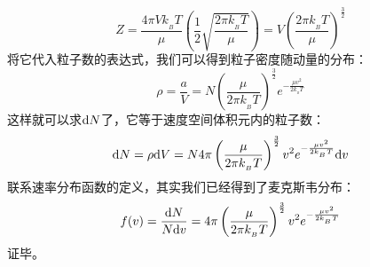 \documentclass{Physics_H_Notes}
\begin{document}
\begin{prove}
\begin{equation}
                Z = \frac{4 \pi V k_{_B}T}{\mu} (\frac{1}{2}\sqrt{\frac{2\pi k_{_B}T}{\mu}}) = V\left(\frac{2\pi k_{_B}T}{\mu}\right)^{\frac{3}{2}}
                \label{of_Z}
            \end{equation}
            将它代入粒子数的表达式，我们可以得到粒子密度随动量的分布：
            \begin{equation}
                \rho = \frac{a}{V} = N\left(\frac{\mu}{2\pi k_{_B}T}\right)^{\frac{3}{2}}e^{-\frac{\mu v^{2}}{2k_{_B}T}}
            \end{equation}
            这样就可以求$\mathrm{d}{N}$了，它等于速度空间体积元内的粒子数：
            \begin{equation}
                \mathrm{d}{N} = \rho \mathrm{d}{V} = N4\pi \left(\frac{\mu}{2\pi k_{_B}T}\right)^{\frac{3}{2}}v^{2}e^{-\frac{\mu v^{2}}{2k_{_B}T}}\mathrm{d}{v}
            \end{equation}
            联系速率分布函数的定义，其实我们已经得到了麦克斯韦分布：
            \begin{equation}
                f(v) = \frac{\mathrm{d}{N}}{N\mathrm{d}{v}} = 4\pi \left(\frac{\mu}{2\pi k_{_B}T}\right)^{\frac{3}{2}}v^{2}e^{-\frac{\mu v^{2}}{2k_{_B}T}}
            \end{equation}
            证毕。
        \end{prove}
\end{document}
